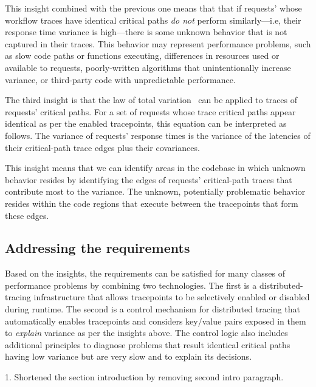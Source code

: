 This insight combined with the previous one means that that if
requests' whose workflow traces have identical critical paths
\textit{do not} perform similarly---i.e, their response time variance
is high---there is some unknown behavior that is not captured in their
traces.  This behavior may represent performance problems, such as
slow code paths or functions executing, differences in resources used
or available to requests, poorly-written algorithms that
unintentionally increase variance, or third-party code with
unpredictable performance.

The third insight is that the law of total
variation~\cite{stats_textbook} can be applied to traces of requests'
critical paths.  For a set of requests whose trace critical paths
appear identical as per the enabled tracepoints, this equation can be
interpreted as follows.  The variance of requests' response times is
the variance of the latencies of their critical-path trace edges plus
their covariances.


This insight means that we can identify areas in the codebase in which
unknown behavior resides by identifying the edges of requests'
critical-path traces that contribute most to the variance.  The
unknown, potentially problematic behavior resides within the code
regions that execute between the tracepoints that form these edges.


\subsection{Addressing the requirements}
\label{sec:motivation:guiding_principles}

Based on the insights, the requirements can be satisfied for many
classes of performance problems by combining two technologies.  The
first is a distributed-tracing infrastructure that allows tracepoints
to be selectively enabled or disabled during runtime.  The second is a
control mechanism for distributed tracing that automatically enables
tracepoints and considers key/value pairs exposed in them
to \textit{explain} variance as per the insights above.  
The control logic also includes additional principles to diagnose problems that result
identical critical paths having low variance but are very slow and to
explain its decisions.
\begin{mycomment}
  1. Shortened the section introduction by removing second intro paragraph.
\end{mycomment}

